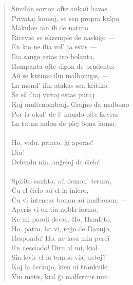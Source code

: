 \begin{verse}
                Similan sorton ofte anka\u u havas\\
                Privataj homoj, se sen propra kulpo\\
                Makulon ian ili de naturo\\
                Ricevis; se ekzemple de naski\^go ---\\
                En kio ne ilia vol' ja estis ---\\
                Ilia sango estas tro bolanta,\\
                Rompanta ofte digon de prudento;\\
                A\u u se kutimo ilin malbonigis, ---\\
                La mond' ilin atakas sen kritiko,\\
                Se e\^c iliaj virtoj estas puraj\\
                Kaj multenombraj. Grajno da malbono\\
                Por la okul' de l' mondo ofte kovras\\
                La tutan indon de plej bona homo.\\
\\
 Ho, vidu, princo, \^gi aperas!\\
 Dio!\\
                Defendu nin, an\^geloj de \^cielo!\\
\\
                Spirito sankta, a\u u demon' terura,\\
                \^Cu el \^cielo a\u u el la infero,\\
                \^Cu vi intencas bonon a\u u malbonon, ---\\
                Aperis vi en tia nobla formo,\\
                Ke mi paroli devas. Ho, Hamleto,\\
                Ho, patro, ho vi, reĝo de Danujo,\\
                Respondu! Ho, ne lasu min perei\\
                En nesciado! Diru al mi, kial\\
                Sin levis el la tombo viaj ostoj?\\
                Kaj la \^cerkujo, kien ni trankvile\\
                Vin metis, kial \^gi malfermis nun\\

\end{verse}
